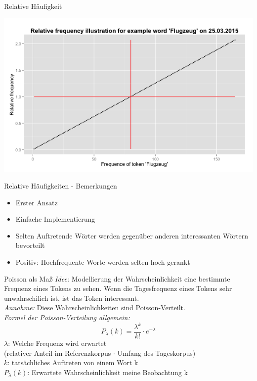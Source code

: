 \documentclass{beamer}
\begin{document}
\begin{frame}{Relative Häufigkeit}
	  \begin{centering}
	  \includegraphics[width=1\textwidth]{pictures/relfreqFlugzeug.png}
	\end{centering}
\end{frame}

\begin{frame}{Relative H\"aufigkeiten - Bemerkungen}
\begin{itemize}
 	\item Erster Ansatz
 	\item Einfache Implementierung
 	\item Selten Auftretende W\"orter werden gegen\"uber anderen interessanten W\"ortern bevorteilt
	\item{Positiv: Hochfrequente Worte werden selten hoch gerankt}
 \end{itemize}
\end{frame}


\begin{frame}{Poisson als Ma\ss}
	\emph{Idee: } Modellierung der Wahrscheinlichkeit eine bestimmte Frequenz eines Tokens zu sehen. Wenn die Tagesfrequenz eines Tokens sehr unwahrschilich ist, ist das Token interessant.\\
	\emph{Annahme: } Diese Wahrscheinlichkeiten sind Poisson-Verteilt.\\
	\emph{Formel der Poisson-Verteilung allgemein: }
	\begin{equation}
	P_\lambda(k) = \frac{\lambda^{k}}{k!}  \cdot e^{-\lambda}
	\end{equation}
	$\lambda$: Welche Frequenz wird erwartet \\
	(relativer Anteil im Referenzkorpus $\cdot$ Umfang des Tageskorpus)\\
	$k$: tats\"achliches Auftreten von einem Wort k\\
	$P_\lambda(k)$: Erwartete Wahrscheinlichkeit meine Beobachtung k
\end{frame}
\end{document}
